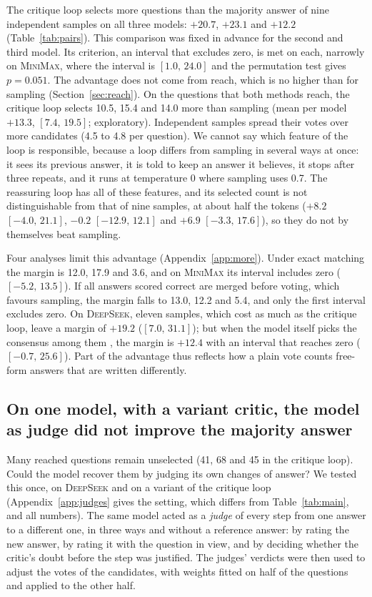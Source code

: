 \documentclass[11pt]{article}
\newcommand{\ds}{\textsc{DeepSeek}}
\newcommand{\mm}{\textsc{MiniMax}}
\newcommand{\ci}[2]{$[#1,\,#2]$}
\begin{document}
The critique loop selects more questions than the majority answer of nine independent samples on all three models: $+20.7$, $+23.1$ and $+12.2$ (Table~\ref{tab:pairs}).
This comparison was fixed in advance for the second and third model.
Its criterion, an interval that excludes zero, is met on each, narrowly on \mm{}, where the interval is \ci{1.0}{24.0} and the permutation test gives $p=0.051$.
The advantage does not come from reach, which is no higher than for sampling (Section~\ref{sec:reach}).
On the questions that both methods reach, the critique loop selects 10.5, 15.4 and 14.0 more than sampling (mean per model $+13.3$, \ci{7.4}{19.5}; exploratory).
Independent samples spread their votes over more candidates (4.5 to 4.8 per question).
We cannot say which feature of the loop is responsible, because a loop differs from sampling in several ways at once: it sees its previous answer, it is told to keep an answer it believes, it stops after three repeats, and it runs at temperature 0 where sampling uses 0.7.
The reassuring loop has all of these features, and its selected count is not distinguishable from that of nine samples, at about half the tokens ($+8.2$ \ci{-4.0}{21.1}, $-0.2$ \ci{-12.9}{12.1} and $+6.9$ \ci{-3.3}{17.6}), so they do not by themselves beat sampling.

Four analyses limit this advantage (Appendix~\ref{app:more}).
Under exact matching the margin is 12.0, 17.9 and 3.6, and on \mm{} its interval includes zero (\ci{-5.2}{13.5}).
If all answers scored correct are merged before voting, which favours sampling, the margin falls to 13.0, 12.2 and 5.4, and only the first interval excludes zero.
On \ds, eleven samples, which cost as much as the critique loop, leave a margin of $+19.2$ (\ci{7.0}{31.1}); but when the model itself picks the consensus among them \citep{chen2023usc}, the margin is $+12.4$ with an interval that reaches zero (\ci{-0.7}{25.6}).
Part of the advantage thus reflects how a plain vote counts free-form answers that are written differently.

\subsection{On one model, with a variant critic, the model as judge did not improve the majority answer}
\label{sec:judges}

Many reached questions remain unselected (41, 68 and 45 in the critique loop).
Could the model recover them by judging its own changes of answer?
We tested this once, on \ds{} and on a variant of the critique loop (Appendix~\ref{app:judges} gives the setting, which differs from Table~\ref{tab:main}, and all numbers).
The same model acted as a \emph{judge} of every step from one answer to a different one, in three ways and without a reference answer: by rating the new answer, by rating it with the question in view, and by deciding whether the critic's doubt before the step was justified.
The judges' verdicts were then used to adjust the votes of the candidates, with weights fitted on half of the questions and applied to the other half.
\end{document}
